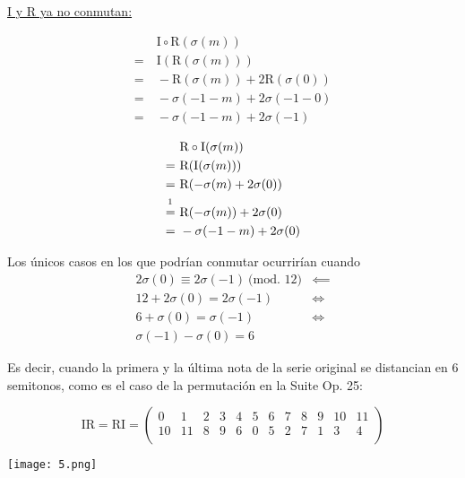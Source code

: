 		 \underline{I y R ya no conmutan:}
		 \vspace{-2\bigskipamount}
		\begin{multicols}{2}
			\begin{align*}
		&\ \text{I}\circ\text{R}(\sigma(m))\\
		=&\ \text{I}(\text{R}(\sigma(m)))\\
		=&\ -\text{R}(\sigma(m))+2\text{R}(\sigma(0))\\
		=&\ -\sigma(-1-m)+2\sigma(-1-0)\\
		=&\ -\sigma(-1-m)+2\sigma(-1)
		\end{align*}
		
		\begin{align*}
		&\ \text{R}\circ\text{I}(\sigma(m))\\
		=&\ \text{R}(\text{I}(\sigma(m)))\\
		=&\ \text{R}(-\sigma(m)+2\sigma(0))\\
		\overset{\footnotemark}{=}&\ \text{R}(-\sigma(m))+2\sigma(0)\\
		=&\ -\sigma(-1-m)+2\sigma(0)
		\end{align*}
		\end{multicols}
		
		Los únicos casos en los que podrían conmutar ocurrirían cuando
		\begin{align*}
		2\sigma\left(0\right)\equiv2\sigma(-1)\ \text{(mod. 12)}&\impliedby\\
		12+2\sigma\left(0\right)=2\sigma\left(-1\right)&\Longleftrightarrow\\
		6+\sigma\left(0\right)=\sigma\left(-1\right)&\Longleftrightarrow\\
		\sigma\left(-1\right)-\sigma\left(0\right)=6&
		\end{align*}
		
		Es decir, cuando la primera y la última nota de la serie original se distancian en 6 semitonos, como es el caso de la permutación en la Suite Op. 25:
		
		\[
		\text{IR}=\text{RI}=\left(\begin{matrix}0&1&2&3&4&5&6&7&8&9&10&11\\10&11&8&9&6&0&5&2&7&1&3&4\\\end{matrix}\right)
		\]	
		
		\texttt{[image: 5.png]}\\
		
